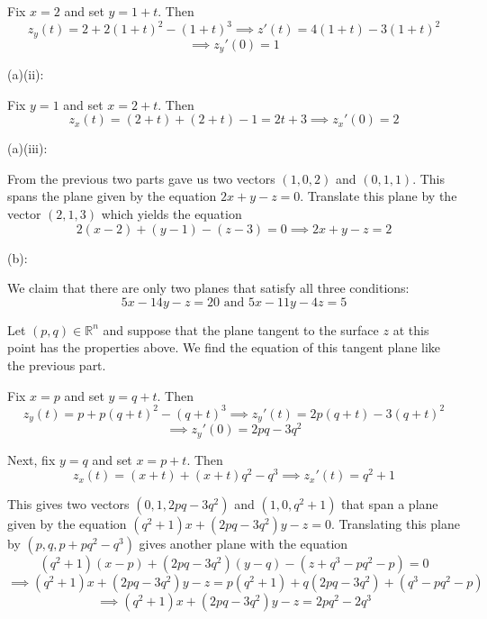 \documentclass{article}
\theoremstyle{plain} %
\numberwithin{thm}{section} %
\theoremstyle{definition}
\begin{document}
\begin{question}{29}
        Fix \(x = 2\) and set \(y = 1+t\). Then
        \[
            z_y(t) = 2 + 2(1+t)^2 - (1+t)^3 \implies z'(t) = 4(1+t) - 3(1+t)^2
        \]
        \[
            \implies z_y'(0) = 1
        \]

        \medskip

        (a)(ii):

        Fix \(y = 1\) and set \(x = 2 + t\). Then
        \[
            z_x(t) = (2+t) + (2+t) - 1 = 2t + 3 \implies z_x'(0) = 2
        \]

        \medskip

        (a)(iii):

        From the previous two parts gave us two vectors \((1,0,2)\) and \((0,1,1)\). This spans the plane given by the equation \(2x+y-z = 0\). Translate this plane by the vector \((2,1,3)\) which yields the equation
        \[
            2(x-2)+(y-1)-(z-3) = 0 \implies 2x+y-z=2
        \]
        \medbreak

        (b):

        We claim that there are only two planes that satisfy all three conditions:
        \[
            5x - 14y - z = 20 \text{ and } 5x - 11y - 4z = 5
        \]

        Let \((p,q) \in \mathbb{R}^n\) and suppose that the plane tangent to the surface \(z\) at this point has the properties above. We find the equation of this tangent plane like the previous part.

        Fix \(x = p\) and set \(y = q + t\). Then
        \[
            z_y(t) = p + p(q+t)^2 - (q+t)^3 \implies z_y'(t) = 2p(q+t) - 3(q+t)^2
        \]
        \[
            \implies z_y'(0) = 2pq - 3q^2
        \]

        Next, fix \(y = q\) and set \(x = p + t\). Then
        \[
            z_x(t) = (x+t) + (x+t)q^2 - q^3 \implies z_x'(t) = q^2 + 1
        \]

        This gives two vectors \((0, 1, 2pq - 3q^2)\) and \((1,0,q^2 + 1)\) that span a plane given by the equation \((q^2 + 1)x + (2pq - 3q^2)y - z = 0\). Translating this plane by \((p,q,p+pq^2 - q^3)\) gives another plane with the equation
        \[
            (q^2 + 1)(x-p) + (2pq - 3q^2)(y-q) - (z + q^3 - pq^2 - p) = 0
        \]
        \[
            \implies (q^2 + 1)x + (2pq - 3q^2)y - z = p(q^2 + 1) + q(2pq - 3q^2) + (q^3 - pq^2 - p)
        \]
        \[
            \implies (q^2 + 1)x + (2pq - 3q^2)y - z = 2pq^2 - 2q^3
        \]


\end{question}
\end{document}
